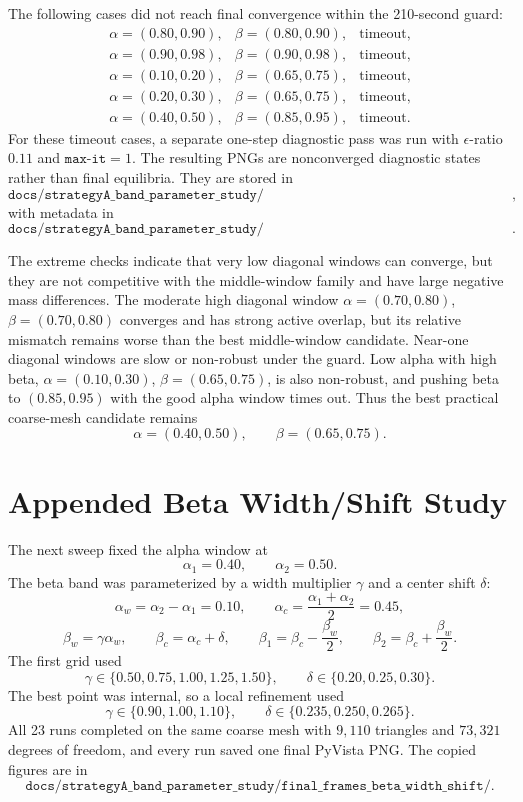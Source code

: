 \documentclass[11pt]{article}
\begin{document}
The following cases did not reach final convergence within the 210-second guard:
\[
\begin{array}{lll}
\alpha=(0.80,0.90), & \beta=(0.80,0.90), & \text{timeout},\\
\alpha=(0.90,0.98), & \beta=(0.90,0.98), & \text{timeout},\\
\alpha=(0.10,0.20), & \beta=(0.65,0.75), & \text{timeout},\\
\alpha=(0.20,0.30), & \beta=(0.65,0.75), & \text{timeout},\\
\alpha=(0.40,0.50), & \beta=(0.85,0.95), & \text{timeout}.
\end{array}
\]
For these timeout cases, a separate one-step diagnostic pass was run with
\(\epsilon\)-ratio \(0.11\) and \(\texttt{max-it}=1\).  The resulting PNGs are
nonconverged diagnostic states rather than final equilibria.  They are stored in
\[
\texttt{docs/strategyA\_band\_parameter\_study/diagnostic\_frames\_extreme\_timeouts/},
\]
with metadata in
\[
\texttt{docs/strategyA\_band\_parameter\_study/coarse\_extreme\_diagnostic\_frames.csv}.
\]

The extreme checks indicate that very low diagonal windows can converge, but
they are not competitive with the middle-window family and have large negative
mass differences.  The moderate high diagonal window
\(\alpha=(0.70,0.80)\), \(\beta=(0.70,0.80)\) converges and has strong active
overlap, but its relative mismatch remains worse than the best middle-window
candidate.  Near-one diagonal windows are slow or non-robust under the guard.
Low alpha with high beta, \(\alpha=(0.10,0.30)\), \(\beta=(0.65,0.75)\), is also
non-robust, and pushing beta to \((0.85,0.95)\) with the good alpha window times
out.  Thus the best practical coarse-mesh candidate remains
\[
\alpha=(0.40,0.50),\qquad \beta=(0.65,0.75).
\]

\section{Appended Beta Width/Shift Study}

The next sweep fixed the alpha window at
\[
\alpha_1=0.40,\qquad \alpha_2=0.50.
\]
The beta band was parameterized by a width multiplier \(\gamma\) and a center
shift \(\delta\):
\[
\alpha_w=\alpha_2-\alpha_1=0.10,\qquad
\alpha_c=\frac{\alpha_1+\alpha_2}{2}=0.45,
\]
\[
\beta_w=\gamma \alpha_w,\qquad
\beta_c=\alpha_c+\delta,\qquad
\beta_1=\beta_c-\frac{\beta_w}{2},\qquad
\beta_2=\beta_c+\frac{\beta_w}{2}.
\]
The first grid used
\[
\gamma\in\{0.50,0.75,1.00,1.25,1.50\},\qquad
\delta\in\{0.20,0.25,0.30\}.
\]
The best point was internal, so a local refinement used
\[
\gamma\in\{0.90,1.00,1.10\},\qquad
\delta\in\{0.235,0.250,0.265\}.
\]
All 23 runs completed on the same coarse mesh with \(9{,}110\) triangles and
\(73{,}321\) degrees of freedom, and every run saved one final PyVista PNG.
The copied figures are in
\[
\texttt{docs/strategyA\_band\_parameter\_study/final\_frames\_beta\_width\_shift/}.
\]
\end{document}
